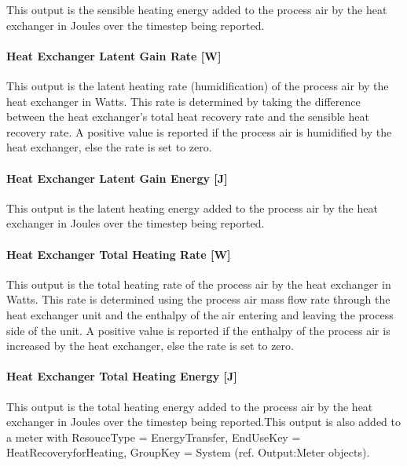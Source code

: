 This output is the sensible heating energy added to the process air by the heat exchanger in Joules over the timestep being reported.

\paragraph{Heat Exchanger Latent Gain Rate {[}W{]}}\label{heat-exchanger-latent-gain-rate-w-2}

This output is the latent heating rate (humidification) of the process air by the heat exchanger in Watts. This rate is determined by taking the difference between the heat exchanger's total heat recovery rate and the sensible heat recovery rate. A positive value is reported if the process air is humidified by the heat exchanger, else the rate is set to zero.

\paragraph{Heat Exchanger Latent Gain Energy {[}J{]}}\label{heat-exchanger-latent-gain-energy-j-1}

This output is the latent heating energy added to the process air by the heat exchanger in Joules over the timestep being reported.

\paragraph{Heat Exchanger Total Heating Rate {[}W{]}}\label{heat-exchanger-total-heating-rate-w-2}

This output is the total heating rate of the process air by the heat exchanger in Watts. This rate is determined using the process air mass flow rate through the heat exchanger unit and the enthalpy of the air entering and leaving the process side of the unit. A positive value is reported if the enthalpy of the process air is increased by the heat exchanger, else the rate is set to zero.

\paragraph{Heat Exchanger Total Heating Energy {[}J{]}}\label{heat-exchanger-total-heating-energy-j-2}

This output is the total heating energy added to the process air by the heat exchanger in Joules over the timestep being reported.This output is also added to a meter with ResouceType = EnergyTransfer, EndUseKey = HeatRecoveryforHeating, GroupKey = System (ref. Output:Meter objects).

